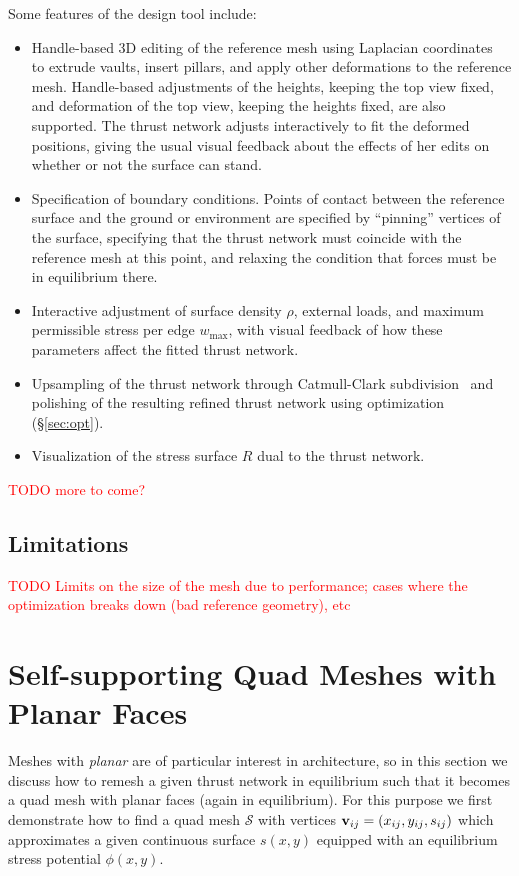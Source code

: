 \documentclass[annual]{acmsiggraph}
\def\SS{{\mathcal S}}
\newcommand{\todo}[1]{\textcolor{red}{#1}}
\newcommand{\secref}[1]{(\S\ref{#1})}
\begin{document}
Some features of the design tool include:
\begin{itemize}
\item Handle-based 3D editing of the reference mesh using Laplacian coordinates~\cite{Lipman2004,Sorkine2003} to extrude vaults, insert pillars, and apply other deformations to the reference mesh. Handle-based adjustments of the heights, keeping the top view fixed, and deformation of the top view, keeping the heights fixed, are also supported. The thrust network adjusts interactively to fit the deformed positions, giving the usual visual feedback about the effects of her edits on whether or not the surface can stand.
\item Specification of boundary conditions. Points of contact between the reference surface and the ground or environment are specified by ``pinning'' vertices of the surface, specifying that the thrust network must coincide with the reference mesh at this point, and relaxing the condition that forces must be in equilibrium there. 
\item Interactive adjustment of surface density $\rho$, external loads, and maximum permissible stress per edge $w_{\textrm{max}}$, with visual feedback of how these parameters affect the fitted thrust network.
\item Upsampling of the thrust network through Catmull-Clark subdivision~\cite{TODO} and polishing of the resulting refined thrust network using optimization \secref{sec:opt}.
\item Visualization of the stress surface $R$ dual to the thrust network.
\end{itemize}
\todo{TODO more to come?}
\subsection{Limitations}
\todo{TODO Limits on the size of the mesh due to performance; cases where the optimization breaks down (bad reference geometry), etc}

\section{Self-supporting Quad Meshes with Planar Faces} \label{sec:pq}

Meshes with {\em planar} are of particular interest in architecture,
so in this section we discuss how to remesh a given thrust network in
equilibrium such that it becomes a quad mesh with planar faces (again 
in equilibrium). For this purpose we first demonstrate how to
find a quad mesh $\SS$ with vertices ${\mathbf v}_{ij}=(x_{ij},y_{ij},s_{ij})$
which approximates
a given continuous surface  $s(x,y)$ 
equipped with an equilibrium stress potential $\phi(x,y)$.
\end{document}
